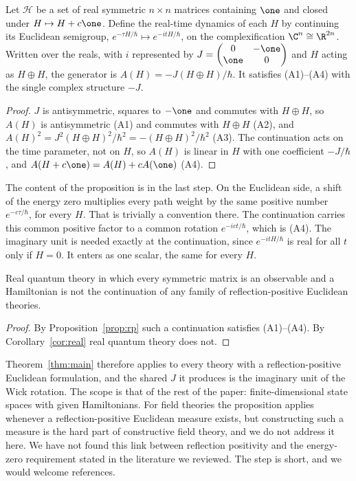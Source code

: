 \begin{proposition}\label{prop:rp}
Let $\mathcal{H}$ be a set of real symmetric $n\times n$ matrices containing $\one$ and closed under $H\mapsto H+c\one$. Define the real-time dynamics of each $H$ by continuing its Euclidean semigroup, $e^{-\tau H/\hbar}\mapsto e^{-itH/\hbar}$, on the complexification $\C^n\cong\R^{2n}$. Written over the reals, with $i$ represented by $J=\begin{pmatrix}0&-\one\\ \one&0\end{pmatrix}$ and $H$ acting as $H\oplus H$, the generator is $A(H)=-J(H\oplus H)/\hbar$. It satisfies (A1)--(A4) with the single complex structure $-J$.
\end{proposition}

\begin{proof}
$J$ is antisymmetric, squares to $-\one$ and commutes with $H\oplus H$, so $A(H)$ is antisymmetric (A1) and commutes with $H\oplus H$ (A2), and $A(H)^2=J^2(H\oplus H)^2/\hbar^2=-(H\oplus H)^2/\hbar^2$ (A3). The continuation acts on the time parameter, not on $H$, so $A(H)$ is linear in $H$ with one coefficient $-J/\hbar$, and $A(H+c\one)=A(H)+cA(\one)$ (A4).
\end{proof}

The content of the proposition is in the last step. On the Euclidean side, a shift of the energy zero multiplies every path weight by the same positive number $e^{-c\tau/\hbar}$, for every $H$. That is trivially a convention there. The continuation carries this common positive factor to a common rotation $e^{-ict/\hbar}$, which is (A4). The imaginary unit is needed exactly at the continuation, since $e^{-itH/\hbar}$ is real for all $t$ only if $H=0$. It enters as one scalar, the same for every $H$.

\begin{corollary}\label{cor:rp}
Real quantum theory in which every symmetric matrix is an observable and a Hamiltonian is not the continuation of any family of reflection-positive Euclidean theories.
\end{corollary}

\begin{proof}
By Proposition~\ref{prop:rp} such a continuation satisfies (A1)--(A4). By Corollary~\ref{cor:real} real quantum theory does not.
\end{proof}

Theorem~\ref{thm:main} therefore applies to every theory with a reflection-positive Euclidean formulation, and the shared $J$ it produces is the imaginary unit of the Wick rotation. The scope is that of the rest of the paper: finite-dimensional state spaces with given Hamiltonians. For field theories the proposition applies whenever a reflection-positive Euclidean measure exists, but constructing such a measure is the hard part of constructive field theory, and we do not address it here. We have not found this link between reflection positivity and the energy-zero requirement stated in the literature we reviewed. The step is short, and we would welcome references.

